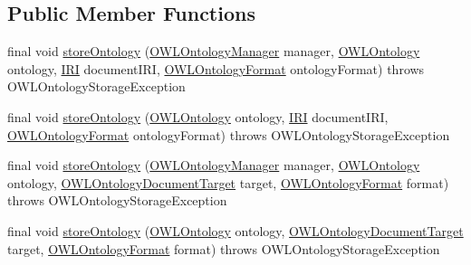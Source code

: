 \subsection*{Public Member Functions}
\begin{DoxyCompactItemize}
\item 
final void \hyperlink{classorg_1_1semanticweb_1_1owlapi_1_1util_1_1_abstract_o_w_l_ontology_storer_a31eab6d8b9f5a658e903f62935470dc4}{store\-Ontology} (\hyperlink{interfaceorg_1_1semanticweb_1_1owlapi_1_1model_1_1_o_w_l_ontology_manager}{O\-W\-L\-Ontology\-Manager} manager, \hyperlink{interfaceorg_1_1semanticweb_1_1owlapi_1_1model_1_1_o_w_l_ontology}{O\-W\-L\-Ontology} ontology, \hyperlink{classorg_1_1semanticweb_1_1owlapi_1_1model_1_1_i_r_i}{I\-R\-I} document\-I\-R\-I, \hyperlink{classorg_1_1semanticweb_1_1owlapi_1_1model_1_1_o_w_l_ontology_format}{O\-W\-L\-Ontology\-Format} ontology\-Format)  throws O\-W\-L\-Ontology\-Storage\-Exception 
\item 
final void \hyperlink{classorg_1_1semanticweb_1_1owlapi_1_1util_1_1_abstract_o_w_l_ontology_storer_a4a4735cfc4180823dc2b17919c88e27a}{store\-Ontology} (\hyperlink{interfaceorg_1_1semanticweb_1_1owlapi_1_1model_1_1_o_w_l_ontology}{O\-W\-L\-Ontology} ontology, \hyperlink{classorg_1_1semanticweb_1_1owlapi_1_1model_1_1_i_r_i}{I\-R\-I} document\-I\-R\-I, \hyperlink{classorg_1_1semanticweb_1_1owlapi_1_1model_1_1_o_w_l_ontology_format}{O\-W\-L\-Ontology\-Format} ontology\-Format)  throws O\-W\-L\-Ontology\-Storage\-Exception 
\item 
final void \hyperlink{classorg_1_1semanticweb_1_1owlapi_1_1util_1_1_abstract_o_w_l_ontology_storer_a680ef623c2503c544222bab3f1122bdc}{store\-Ontology} (\hyperlink{interfaceorg_1_1semanticweb_1_1owlapi_1_1model_1_1_o_w_l_ontology_manager}{O\-W\-L\-Ontology\-Manager} manager, \hyperlink{interfaceorg_1_1semanticweb_1_1owlapi_1_1model_1_1_o_w_l_ontology}{O\-W\-L\-Ontology} ontology, \hyperlink{interfaceorg_1_1semanticweb_1_1owlapi_1_1io_1_1_o_w_l_ontology_document_target}{O\-W\-L\-Ontology\-Document\-Target} target, \hyperlink{classorg_1_1semanticweb_1_1owlapi_1_1model_1_1_o_w_l_ontology_format}{O\-W\-L\-Ontology\-Format} format)  throws O\-W\-L\-Ontology\-Storage\-Exception 
\item 
final void \hyperlink{classorg_1_1semanticweb_1_1owlapi_1_1util_1_1_abstract_o_w_l_ontology_storer_a7d318e43d53fd02cf9814fb885de3ef0}{store\-Ontology} (\hyperlink{interfaceorg_1_1semanticweb_1_1owlapi_1_1model_1_1_o_w_l_ontology}{O\-W\-L\-Ontology} ontology, \hyperlink{interfaceorg_1_1semanticweb_1_1owlapi_1_1io_1_1_o_w_l_ontology_document_target}{O\-W\-L\-Ontology\-Document\-Target} target, \hyperlink{classorg_1_1semanticweb_1_1owlapi_1_1model_1_1_o_w_l_ontology_format}{O\-W\-L\-Ontology\-Format} format)  throws O\-W\-L\-Ontology\-Storage\-Exception 
\end{DoxyCompactItemize}
